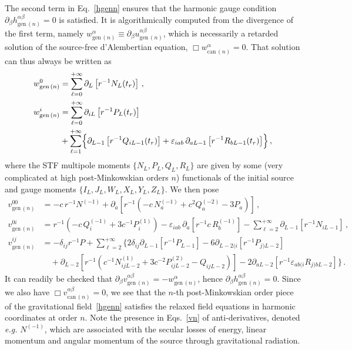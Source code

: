 \documentclass[prd,preprint,superscriptaddress,tightenlines,nofootinbib,
  eqsecnum,showpacs]{revtex4}
\begin{document}
The second term in Eq.~\eqref{hgenn} ensures that the harmonic gauge
condition $\partial_\beta h^{\alpha\beta}_{\mathrm{gen}\,(n)}=0$ is
satisfied. It is algorithmically computed from the divergence of the
first term, namely $w^{\alpha}_{\mathrm{gen}\,(n)} \equiv
\partial_{\beta}u^{\alpha\beta}_{\mathrm{gen}\,(n)}$, which is necessarily a
retarded solution of the source-free d'Alembertian equation, $\Box
w^{\alpha}_{\mathrm{can}\,(n)}=0$. That solution can thus always be written as
%
\begin{subequations} \label{wn}
\begin{align}
w^0_{\mathrm{gen}\,(n)} &= \sum_{\ell = 0}^{+\infty} \partial_L
\left[r^{-1} N_L(t_r)\right] \,, \\ w^i_{\mathrm{gen}\,(n)} & =
\sum_{\ell =0}^{+\infty}\partial_{iL} \left[ r^{-1} P_L (t_r)
  \right] \nonumber \\ & + \sum_{\ell = 1}^{+\infty} \Bigl\{
\partial_{L-1} \left[ r^{-1} Q_{iL-1} (t_r) \right] +
\varepsilon_{iab} \, \partial_{aL-1} \left[r^{-1} R_{bL-1} (t_r)
  \right] \Bigr\} \,,
\end{align}
\end{subequations}
%
where the STF multipole moments $\{N_L, P_L, Q_L, R_L\}$ are given by
some (very complicated at high post-Minkowskian orders $n$)
functionals of the initial source and gauge moments $\{I_L, J_L, W_L,
X_L, Y_L, Z_L\}$. We then pose~\cite{BD86,B98mult} 
%
\begin{subequations} \label{vn}
\begin{align}
v^{00}_{\mathrm{gen}\,(n)} &= - c\, r^{-1} N^{(-1)} + \partial_a \left[
  r^{-1} \left(- c\, N^{(-1)}_a+ c^2 Q^{(-2)}_a -3P_a\right) \right] \, ,
\\ v^{0i}_{\mathrm{gen}\,(n)} &= r^{-1} \left( - c\, Q^{(-1)}_i +3 c^{-1}
P^{(1)}_i\right) - \varepsilon_{iab} \, \partial_a \left[ r^{-1} c\, 
  R^{(-1)}_b \right] - \sum_{\ell = 2}^{+\infty}\partial_{L-1} \left[
  r^{-1} N_{iL-1} \right] \, , \\ v^{ij}_{\mathrm{gen}\,(n)} &= -
\delta_{ij} r^{-1} P + \sum_{\ell = 2}^{+\infty} \biggl\{ 2
\delta_{ij}\partial_{L-1} \left[ r^{-1} P_{L-1}\right] - 6
\partial_{L-2(i} \left[ r^{-1} P_{j)L-2}\right] \nonumber \\ & \quad +
\partial_{L-2} \left[ r^{-1} (c^{-1}N^{(1)}_{ijL-2} + 3 c^{-2} P^{(2)}_{ijL-2} -
  Q_{ijL-2}) \right] - 2 \partial_{aL-2}\left[ r^{-1}
  \varepsilon_{ab(i} R_{j)bL-2} \right] \biggr\} \,.
\end{align}
\end{subequations}
%
It can readily be checked that $\partial_\beta
v^{\alpha\beta}_{\mathrm{gen}\,(n)}=-w^{\alpha}_{\mathrm{gen}\,(n)}$,
hence $\partial_\beta h^{\alpha\beta}_{\mathrm{gen}\,(n)}=0$. Since we
also have $\Box v^{\alpha\beta}_{\mathrm{can}\,(n)}=0$, we see that
the $n$-th post-Minkowskian order piece of the gravitational
field~\eqref{hgenn} satisfies the relaxed field equations in harmonic
coordinates at order $n$.  Note the presence in Eqs.~\eqref{vn} of
anti-derivatives, denoted \textit{e.g.} $N^{(-1)}$, which are
associated with the secular losses of energy, linear momentum and
angular momentum of the source through gravitational radiation.
\end{document}
